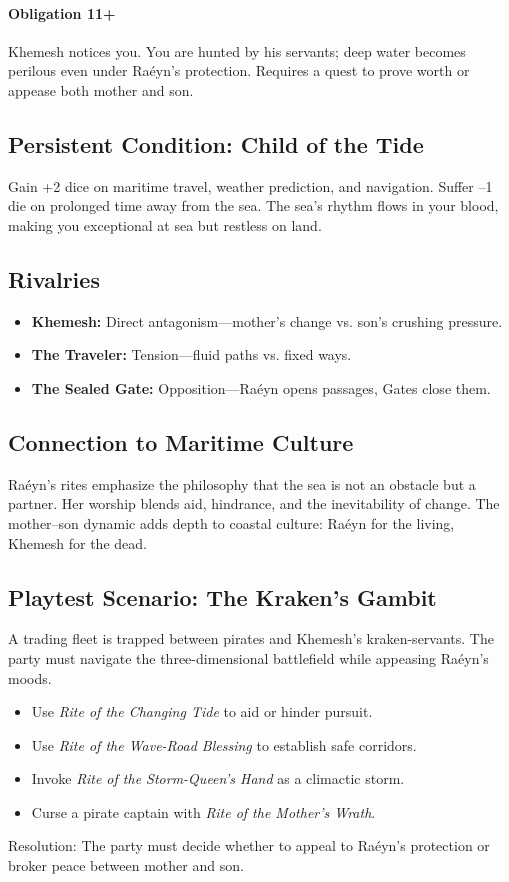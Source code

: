 \paragraph{Obligation 11+} Khemesh notices you. You are hunted by his servants; deep water becomes perilous even under Raéyn's protection. Requires a quest to prove worth or appease both mother and son.

\subsection*{Persistent Condition: Child of the Tide}
Gain +2 dice on maritime travel, weather prediction, and navigation. Suffer --1 die on prolonged time away from the sea. The sea’s rhythm flows in your blood, making you exceptional at sea but restless on land.

\subsection*{Rivalries}
\begin{itemize}
\item \textbf{Khemesh:} Direct antagonism---mother’s change vs. son’s crushing pressure.  
\item \textbf{The Traveler:} Tension---fluid paths vs. fixed ways.  
\item \textbf{The Sealed Gate:} Opposition---Raéyn opens passages, Gates close them.  
\end{itemize}

\subsection*{Connection to Maritime Culture}
Raéyn’s rites emphasize the philosophy that the sea is not an obstacle but a partner. Her worship blends aid, hindrance, and the inevitability of change. The mother--son dynamic adds depth to coastal culture: Raéyn for the living, Khemesh for the dead.

\subsection*{Playtest Scenario: The Kraken's Gambit}
A trading fleet is trapped between pirates and Khemesh’s kraken-servants. The party must navigate the three-dimensional battlefield while appeasing Raéyn’s moods.

\begin{itemize}
\item Use \emph{Rite of the Changing Tide} to aid or hinder pursuit.  
\item Use \emph{Rite of the Wave-Road Blessing} to establish safe corridors.  
\item Invoke \emph{Rite of the Storm-Queen’s Hand} as a climactic storm.  
\item Curse a pirate captain with \emph{Rite of the Mother’s Wrath}.  
\end{itemize}

Resolution: The party must decide whether to appeal to Raéyn’s protection or broker peace between mother and son.
